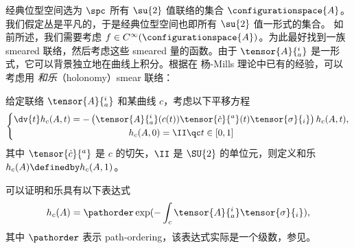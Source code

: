 		经典位型空间选为 $\spc$ 所有 $\su{2}$ 值联络的集合 $\configurationspace{A}$。我们假定丛是平凡的，于是经典位型空间也即所有 $\su{2}$ 值一形式的集合。%
		如前所述，我们需要考虑 $f\in C^\infty(\configurationspace{A})$。为此最好找到一族 smeared 联络，然后考虑这些 smeared 量的函数。由于 $\tensor{A}{^i_a}$ 是一形式，它可以背景独立地在曲线上积分。根据在 杨-Mills 理论中已有的经验，可以考虑用 \emph{和乐}（holonomy）smear 联络：
		\begin{Definition}[Holonomy]
			给定联络 $\tensor{A}{^i_a}$ 和某曲线 $c$，考虑以下平移方程
			\begin{equation}
				\left\{
					\begin{gathered}
						\dv{t}h_c(A,t) = - \left( \tensor{A}{^i_a}(c(t)) \tensor{\dot{c}}{^a}(t) \tensor{\sigma}{_i} \right) h_c(A,t),\\
						h_c(A,0) = \II \qc t\in\left[ 0,1 \right]
					\end{gathered}
				\right.
			\end{equation}
			其中 $\tensor{\dot{c}}{^a}$ 是 $c$ 的切矢，$\II$ 是 $\SU{2}$ 的单位元，则定义和乐 $h_c(A) \definedby h_c(A,1)$。
		\end{Definition}
		可以证明和乐具有以下表达式
		\begin{equation}
			h_c(A) = \pathorder \exp(-\int_c \tensor{A}{^i_a} \tensor{\sigma}{_i}),\label{eq-holonomy}
		\end{equation}
		其中 $\pathorder$ 表示 path-ordering，该表达式实际是一个级数，参见\cite{Baez1994,Nakahara2003}。

